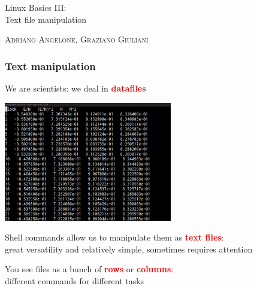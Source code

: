 \documentclass[unknownkeysallowed, 10pt, a4 paper, handout]{beamer}
\newcommand{\focus}[1]{\textbf{\textcolor{red}{#1}}}
\begin{document}
\begin{frame}
  \begin{center}


    \begin{block}{}
      \Large
      \centering
      Linux Basics III:\\
      Text file manipulation
    \end{block}

    \vspace{6mm}
    \large
    \textsc{Adriano Angelone, Graziano Giuliani} \\

  \end{center}
\end{frame}

\begin{frame}
  \begin{center}
    \frametitle{Text manipulation}
    We are scientists: we deal in \focus{datafiles}

    \begin{center}
      \includegraphics[width=0.55\textwidth]{pics/datafile.png}
    \end{center}

    Shell commands allow us to manipulate them as \focus{text files}:\\
    great versatility and relatively simple, sometimes requires attention

    You see files as a bunch of \focus{rows} or \focus{columns}:\\
    different commands for different tasks
  \end{center}
\end{frame}
\end{document}
